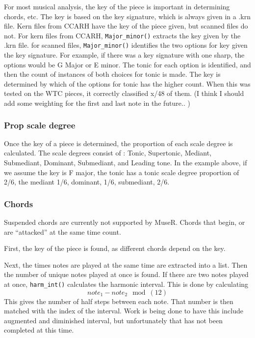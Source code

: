 \documentclass[12pt,twoside]{reedthesis}
\theoremstyle{definition}
\theoremstyle{definition}
\theoremstyle{definition}
\theoremstyle{remark}
\begin{document}
For most musical analysis, the key of the piece is important in
determining chords, etc. The key is based on the key signature, which is
always given in a .krn file. Kern files from CCARH have the key of the
piece given, but scanned files do not. For kern files from CCARH,
\texttt{Major\_minor()} extracts the key given by the .krn file. for
scanned files, \texttt{Major\_minor()} identifies the two options for
key given the key signature. For example, if there was a key signature
with one sharp, the options would be G Major or E minor. The tonic for
each option is identified, and then the count of instances of both
choices for tonic is made. The key is determined by which of the options
for tonic has the higher count. When this was tested on the WTC pieces,
it correctly classified x/48 of them. (I think I should add some
weighting for the first and last note in the future.. )

\subsubsection{Prop scale degree}\label{prop-scale-degree}

Once the key of a piece is determined, the proportion of each scale
degree is calculated. The scale degrees consist of : Tonic, Supertonic,
Mediant, Submediant, Dominant, Submediant, and Leading tone. In the
example above, if we assume the key is F major, the tonic has a tonic
scale degree proportion of 2/6, the mediant 1/6, dominant, 1/6,
submediant, 2/6.

\subsubsection{Chords}\label{chords}

Suspended chords are currently not supported by MuseR. Chords that
begin, or are ``attacked'' at the same time count.

First, the key of the piece is found, as different chords depend on the
key.

Next, the times notes are played at the same time are extracted into a
list. Then the number of unique notes played at once is found. If there
are two notes played at once, \texttt{harm\_int()} calculates the
harmonic interval. This is done by calculating
\[note_1 - note_2 \mod(12)\] This gives the number of half steps between
each note. That number is then matched with the index of the interval.
Work is being done to have this include augmented and diminished
interval, but unfortunately that has not been completed at this time.
\end{document}
